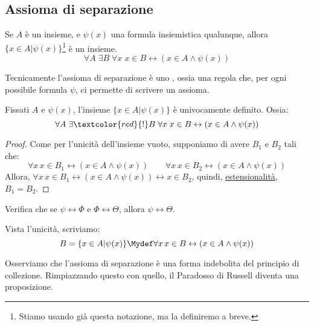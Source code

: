 \documentclass[11pt]{scrartcl}
\begin{document}
\subsection{Assioma di separazione}
\begin{axiom}
\label{ax3}
Se $A$ è un insieme, e $\psi(x)$ una formula insiemistica qualunque, allora $\{x \in A | \psi (x)\}$\footnote{Stiamo usando già questa notazione, ma la definiremo a breve.} è un insieme.
\[ \forall A \; \exists B \; \forall x \; x \in B \leftrightarrow (x \in A \land \psi (x))
	\]
\end{axiom}

\begin{note}
Tecnicamente l'assioma di separazione è uno , ossia una regola che, per ogni possibile formula $\psi$, ci permette di scrivere un assioma.
\end{note}

\begin{proposition}
Fissati $A$ e $\psi(x)$, l'insieme $\{x \in A | \psi(x)\}$ è univocamente definito. Ossia:
\[ \forall A \; \exists \textcolor{red}{!} B \; \forall x \; x \in B \leftrightarrow (x \in A \land \psi(x))
	\]
\end{proposition}

\begin{proof}
Come per l'unicità dell'insieme vuoto, supponiamo di avere $B_1$ e $B_2$ tali che:
\[ \forall x \, x \in B_1 \leftrightarrow (x \in A \land \psi(x)) \qquad \forall x \, x \in B_2 \leftrightarrow (x \in A \land \psi(x))
	\]
Allora, $\forall x \, x \in B_1 \leftrightarrow (x \in A \land \psi(x)) \leftrightarrow x \in B_2$, quindi, \hyperref[ax2]{estensionalità}, $B_1 = B_2$.
\end{proof}

\begin{exercise}
Verifica che se $\psi \leftrightarrow \Phi$ e $\Phi \leftrightarrow \Theta$, allora $\psi \leftrightarrow \Theta$.
\end{exercise}

\begin{notation}
Vista l'unicità, scriviamo:
\[ B = \{x \in A | \psi(x)\} \Mydef \forall x \, x \in B \leftrightarrow (x \in A \land \psi(x))
	\]
\end{notation}

Osserviamo che l'assioma di separazione è una forma indebolita del principio di collezione. Rimpiazzando questo con quello, il Paradosso di Russell diventa una proposizione.
\end{document}
